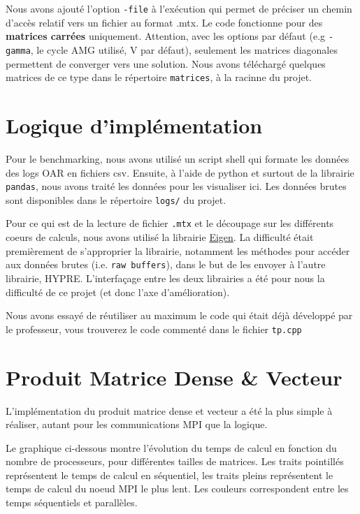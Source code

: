 \documentclass[10pt,twocolumn,letterpaper]{article}
\def\code#1{\texttt{#1}}
\begin{document}
Nous avons ajouté l'option \code{-file} à l'exécution qui permet de préciser
un chemin d'accès relatif vers un fichier au format .mtx. Le code fonctionne
pour des \textbf{matrices carrées} uniquement. Attention, avec les options par 
défaut (e.g \code{-gamma}, le cycle AMG utilisé, V par défaut), seulement les
matrices diagonales permettent de converger vers une solution. Nous avons 
téléchargé quelques matrices de ce type dans le répertoire \code{matrices}, 
à la racinne du projet.


\section{Logique d'implémentation}

Pour le benchmarking, nous avons utilisé un script shell qui formate les données
des logs OAR en fichiers csv.
Ensuite, à l'aide de python et surtout de la librairie \code{pandas}, nous avons
traité les données pour les visualiser ici.
Les données brutes sont disponibles dans le répertoire \code{logs/} du projet.

Pour ce qui est de la lecture de fichier \code{.mtx} et le découpage sur les
différents coeurs de calculs, nous avons utilisé la librairie
\href{https://eigen.tuxfamily.org/index.php?title=Main_Page}{Eigen}.
La difficulté était premièrement de s'approprier la librairie, notamment les
méthodes pour accéder aux données brutes (i.e. \code{raw buffers}), dans le but
de les envoyer à l'autre librairie, HYPRE. L'interfaçage entre les deux
librairies a été pour nous la difficulté de ce projet (et donc l'axe
d'amélioration).

Nous avons essayé de réutiliser au maximum le code qui était déjà développé par
le professeur, vous trouverez le code commenté dans le fichier \code{tp.cpp}

\section{Produit Matrice Dense \& Vecteur}

L'implémentation du produit matrice dense et vecteur a été la plus simple à réaliser, autant pour les communications MPI que la logique.

Le graphique ci-dessous montre l'évolution du temps de calcul en fonction du nombre de processeurs, pour différentes tailles de matrices.
Les traits pointillés représentent le temps de calcul en séquentiel, les traits pleins représentent le temps de calcul du noeud MPI le plus lent.
Les couleurs correspondent entre les temps séquentiels et parallèles.
\end{document}
